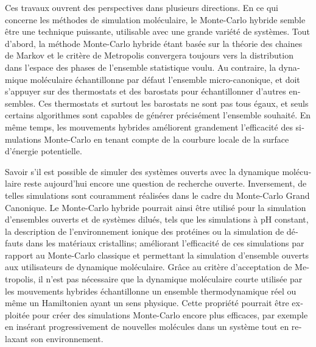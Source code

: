 \documentclass[thesis]{subfiles}
\begin{document}
\begin{otherlanguage}{french}
Ces travaux ouvrent des perspectives dans plusieurs directions. En ce qui
concerne les méthodes de simulation moléculaire, le Monte-Carlo hybride semble
être une technique puissante, utilisable avec une grande variété de systèmes.
Tout d'abord, la méthode Monte-Carlo hybride étant basée sur la théorie des
chaines de Markov et le critère de Metropolis convergera toujours vers la
distribution dans l'espace des phases de l'ensemble statistique voulu. Au
contraire, la dynamique moléculaire échantillonne par défaut l'ensemble
micro-canonique, et doit s'appuyer sur des thermostats et des barostats pour
échantillonner d'autres ensembles. Ces thermostats et surtout les barostats ne
sont pas tous égaux, et seuls certains algorithmes sont capables de générer
précisément l'ensemble souhaité. En même temps, les mouvements hybrides
améliorent grandement l'efficacité des simulations Monte-Carlo en tenant compte
de la courbure locale de la surface d'énergie potentielle.

Savoir s'il est possible de simuler des systèmes ouverts avec la dynamique
moléculaire reste aujourd'hui encore une question de recherche ouverte.
Inversement, de telles simulations sont couramment réalisées dans le cadre du
Monte-Carlo Grand Canonique. Le Monte-Carlo hybride pourrait ainsi être utilisé
pour la simulation d'ensembles ouverts et de systèmes dilués, tels que les
simulations à pH constant, la description de l'environnement ionique des
protéines ou la simulation de défauts dans les matériaux cristallins; améliorant
l'efficacité de ces simulations par rapport au Monte-Carlo classique et
permettant la simulation d'ensemble ouverts aux utilisateurs de dynamique
moléculaire. Grâce au critère d'acceptation de Metropolis, il n'est pas
nécessaire que la dynamique moléculaire courte utilisée par les mouvements
hybrides échantillonne un ensemble thermodynamique réel ou même un Hamiltonien
ayant un sens physique. Cette propriété pourrait être exploitée pour créer des
simulations Monte-Carlo encore plus efficaces, par exemple en insérant
progressivement de nouvelles molécules dans un système tout en relaxant son
environnement.


\end{otherlanguage}
\end{document}
